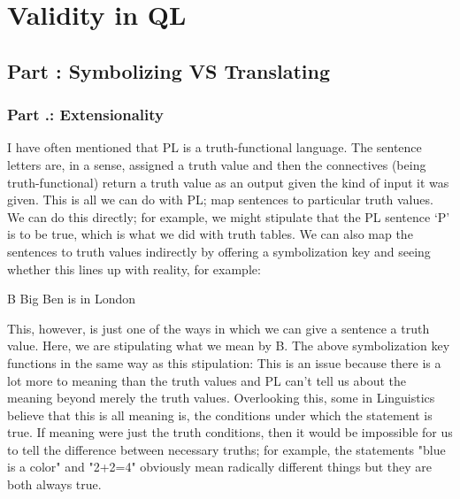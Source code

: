 \part{Validity in QL}
\label{ch.qlvalidity}
\setcounter{seccount}{1}
\chapter{Part \thechapcount: Symbolizing VS Translating}
\section{Part \thechapcount.\theseccount: Extensionality}
I have often mentioned that PL is a truth-functional language. The sentence letters are, in a sense, assigned a truth value and then the connectives (being truth-functional) return a truth value as an output given the kind of input it was given. This is all we can do with PL; map sentences to particular truth values. We can do this directly; for example, we might stipulate that the PL sentence ‘P’ is to be true, which is what we did with truth tables. We can also map the sentences to truth values indirectly by offering a symbolization key and seeing whether this lines up with reality, for example:
\begin{ekey}
\item[B] Big Ben is in London
\end{ekey}
This, however, is just one of the ways in which we can give a sentence a truth value. Here, we are stipulating what we mean by B. The above symbolization key functions in the same way as this stipulation:
This is an issue because there is a lot more to meaning than the truth values and PL can't tell us about the meaning beyond merely the truth values. Overlooking this, some in Linguistics believe that this is all meaning is, the conditions under which the statement is true. If meaning were just the truth conditions, then it would be impossible for us to tell the difference between necessary truths; for example, the statements "blue is a color" and "2+2=4" obviously mean radically different things but they are both always true.

